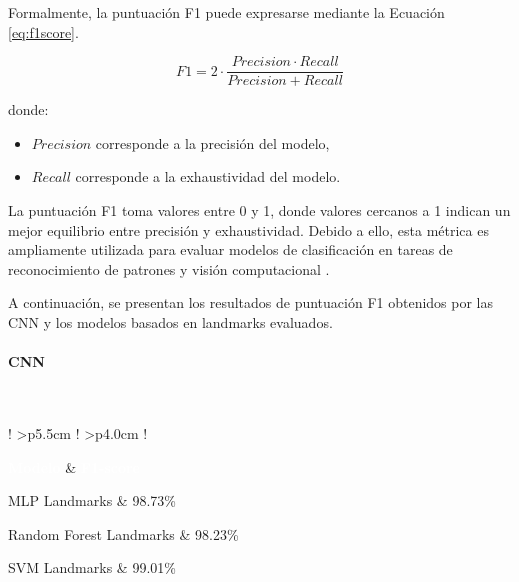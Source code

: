 	Formalmente, la puntuación F1 puede expresarse mediante la Ecuación \ref{eq:f1score}.
	
	\begin{equation}
		\label{eq:f1score}
		F1 = 2 \cdot \frac{Precision \cdot Recall}{Precision + Recall}
	\end{equation}
	
	donde:
	\begin{itemize}
		\item $Precision$ corresponde a la precisión del modelo,
		\item $Recall$ corresponde a la exhaustividad del modelo.
	\end{itemize}
	
	La puntuación F1 toma valores entre 0 y 1, donde valores cercanos a 1 indican un mejor equilibrio entre precisión y exhaustividad. Debido a ello, esta métrica es ampliamente utilizada para evaluar modelos de clasificación en tareas de reconocimiento de patrones y visión computacional \cite{chollet2021deep}.
	
	A continuación, se presentan los resultados de puntuación F1 obtenidos por las CNN y los modelos basados en landmarks evaluados.
	\paragraph{CNN}\mbox{}\\
	
	{
		
		\small
		\renewcommand{\arraystretch}{1.15}
		
		\begin{table}[H]
			\centering
			\caption{Comparación de puntuación F1 (\textit{F1-score}) obtenida por los modelos evaluados utilizando landmarks extraídos mediante MediaPipe Hands.}
			\label{tab:landmarks_f1}
			
			\begin{tabular}{
					!{\vrule width 0.6pt}
					>{\centering\arraybackslash}p{5.5cm}
					!{\vrule width 0.6pt}
					>{\centering\arraybackslash}p{4.0cm}
					!{\vrule width 0.6pt}
				}
				\hline
				
				\textcolor{white}{\textbf{Modelo}} &
				\textcolor{white}{\textbf{F1-score}} \\
				
				\hline
				
				MLP Landmarks &
				98.73\% \\
				\hline
				
				Random Forest Landmarks &
				98.23\% \\
				\hline
				
				SVM Landmarks &
				99.01\% \\
				\hline
				
			\end{tabular}
		\end{table}
	}
	
